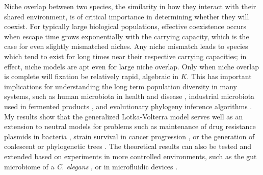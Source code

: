 Niche overlap between two species, the similarity in how they interact with their shared environment, is of critical importance in determining whether they will coexist. 
For typically large biological populations, effective coexistence occurs when escape time grows exponentially with the carrying capacity, which is the case for even slightly mismatched niches. 
Any niche mismatch leads to species which tend to exist for long times near their respective carrying capacities; in effect, niche models are apt even for large niche overlap. 
Only when niche overlap is complete will fixation be relatively rapid, algebraic in $K$. 
This has important implications for understanding the long term population diversity in many systems, such as human microbiota in health and disease \cite{Coburn2015,Palmer2001,Kinross2011}, industrial microbiota used in fermented products \cite{Wolfe2014}, and evolutionary phylogeny inference algorithms \cite{Rice2004,Blythe2007}. 
My results show that the generalized Lotka-Volterra model serves well as an extension to neutral models for problems such as maintenance of drug resistance plasmids in bacteria \cite{Gooding-townsend2015}, strain survival in cancer progression \cite{Ashcroft2015}, or the generation of coalescent or phylogenetic trees \cite{Kingman1982,Rice2004,Rogers2014}. 
The theoretical results can also be tested and extended based on experiments in more controlled environments, such as the gut microbiome of a \textit{C. elegans} \cite{Vega2017}, or in microfluidic devices \cite{Hung2005}. %


